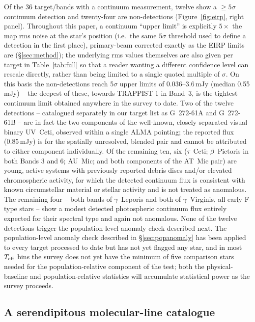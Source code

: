 \documentclass{openjournal}
\begin{document}
Of the 36 target/bands with a continuum measurement, twelve show a
$\geq5\sigma$ continuum detection and twenty-four are non-detections
(Figure~\ref{fig:eirp}, right panel). Throughout this paper, a continuum
``upper limit'' is explicitly $5\times$ the map rms noise at the star's
position (i.e.\ the same $5\sigma$ threshold used to define a detection
in the first place), primary-beam corrected exactly as the EIRP limits
are (\S\ref{sec:method}); the underlying rms values themselves are also
given per target in Table~\ref{tab:full} so that a reader wanting a
different confidence level can rescale directly, rather than being
limited to a single quoted multiple of $\sigma$. On this basis the
non-detections reach 5$\sigma$ upper limits of 0.036--3.6\,mJy (median
0.55\,mJy) -- the deepest of these, towards TRAPPIST-1 in Band~3, is
the tightest continuum limit obtained anywhere in the survey to date.
Two of the twelve detections -- catalogued separately in our target list
as G~272-61A and G~272-61B -- are in fact the two components of the
well-known, closely separated visual binary UV~Ceti, observed within a
single ALMA pointing; the reported flux (0.85\,mJy) is for the spatially
unresolved, blended pair and cannot be attributed to either component
individually. Of the remaining ten, six ($\tau$~Ceti; $\beta$~Pictoris in
both Bands 3 and 6; AU~Mic; and both components of the AT~Mic pair) are
young, active systems with previously reported debris discs and/or
elevated chromospheric activity, for which the detected continuum flux
is consistent with known circumstellar material or stellar activity and
is not treated as anomalous. The remaining four -- both bands of
$\gamma$~Leporis and both of $\gamma$~Virginis, all early F-type stars --
show a modest detected photospheric continuum flux entirely expected for
their spectral type and again not anomalous. None of the twelve
detections trigger the population-level anomaly check described next.
The population-level anomaly check described in
\S\ref{sec:popanomaly} has been applied to every target processed to
date but has not yet flagged any star, and in most $T_{\rm eff}$ bins the
survey does not yet have the minimum of five comparison stars needed for
the population-relative component of the test; both the physical-baseline
and population-relative statistics will accumulate statistical power as
the survey proceeds.

\subsection{A serendipitous molecular-line catalogue}
\label{sec:linecatalogue}
\end{document}
